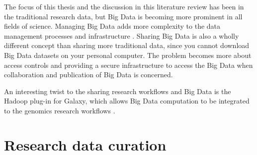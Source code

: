 The focus of this thesis and the discussion in this literature review has been
in the traditional research data, but Big Data is becoming more prominent in
all fields of science. Managing Big Data adds more complexity to the data
management processes and infrastructure
\cite{DBLP:conf/cloudcom/DemchenkoZGWL12}. Sharing Big Data is also a wholly
different concept than sharing more traditional data, since you cannot download
Big Data datasets on your personal computer. The problem becomes more about
access controls and providing a secure infrastructure to access the Big Data
when collaboration and publication of Big Data is concerned.

An interesting twist to the sharing research workflows and Big Data is the
Hadoop plug-in for Galaxy, which allows Big Data computation to be integrated
to the genomics research workflows \cite{DBLP:conf/bcb/PiredduLSZ14}.

\section{Research data curation}


